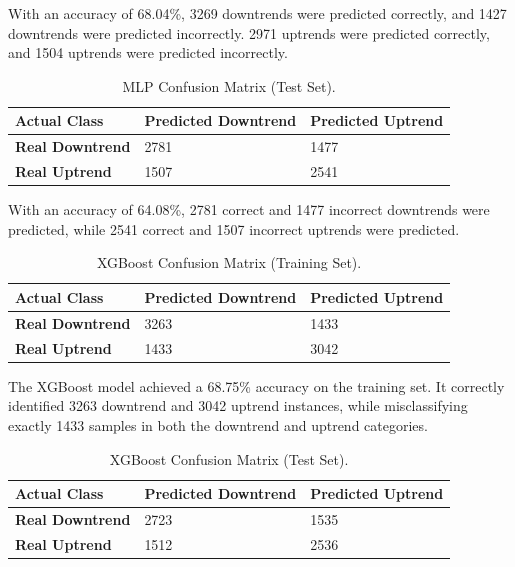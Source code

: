 \documentclass{ieeeaccess}
\begin{document}
With an accuracy of 68.04\%, 3269 downtrends were predicted correctly, and 1427 downtrends were predicted incorrectly. 2971 uptrends were predicted correctly, and 1504 uptrends were predicted incorrectly.

\begin{table}[!ht]
\caption{MLP Confusion Matrix (Test Set).}
\label{tab:confusion_test}
\setlength{\tabcolsep}{3pt}
\begin{tabular}{|p{75pt}|p{70pt}|p{70pt}|}
\hline
\textbf{Actual Class} & \textbf{Predicted Downtrend} & \textbf{Predicted Uptrend} \\ 
\hline
\textbf{Real Downtrend} & 2781 & 1477 \\
\textbf{Real Uptrend} & 1507 & 2541 \\ 
\hline
\end{tabular}
\end{table}

With an accuracy of 64.08\%, 2781 correct and 1477 incorrect downtrends were predicted, while 2541 correct and 1507 incorrect uptrends were predicted.

\begin{table}[!ht]
\caption{XGBoost Confusion Matrix (Training Set).}
\label{tab:xgb_confusion_training}
\setlength{\tabcolsep}{3pt}
\begin{tabular}{|p{75pt}|p{70pt}|p{70pt}|}
\hline
\textbf{Actual Class} & \textbf{Predicted Downtrend} & \textbf{Predicted Uptrend} \\ 
\hline
\textbf{Real Downtrend} & 3263 & 1433 \\
\textbf{Real Uptrend} & 1433 & 3042 \\ 
\hline
\end{tabular}
\end{table}

The XGBoost model achieved a 68.75\% accuracy on the training set. It correctly identified 3263 downtrend and 3042 uptrend instances, while misclassifying exactly 1433 samples in both the downtrend and uptrend categories.

\begin{table}[!ht]
\caption{XGBoost Confusion Matrix (Test Set).}
\label{tab:xgb_confusion_test}
\setlength{\tabcolsep}{3pt}
\begin{tabular}{|p{75pt}|p{70pt}|p{70pt}|}
\hline
\textbf{Actual Class} & \textbf{Predicted Downtrend} & \textbf{Predicted Uptrend} \\ 
\hline
\textbf{Real Downtrend} & 2723 & 1535 \\
\textbf{Real Uptrend} & 1512 & 2536 \\ 
\hline
\end{tabular}
\end{table}
\end{document}
